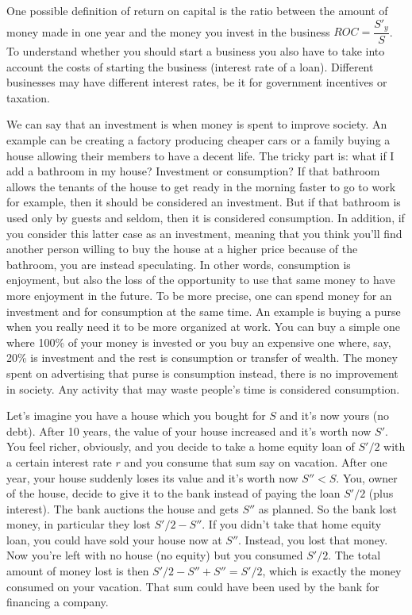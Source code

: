 One possible definition of return on capital is the ratio between the amount of money made in one year and the money you invest in the business $ROC = \dfrac{S'_y}{S}$. To understand whether you should start a business you also have to take into account the costs of starting the business (interest rate of a loan). Different businesses may have different interest rates, be it for government incentives or taxation.

We can say that an investment is when money is spent to improve society. An example can be creating a factory producing cheaper cars or a family buying a house allowing their members to have a decent life. The tricky part is: what if I add a bathroom in my house? Investment or consumption? If that bathroom allows the tenants of the house to get ready in the morning faster to go to work for example, then it should be considered an investment. But if that bathroom is used only by guests and seldom, then it is considered consumption. In addition, if you consider this latter case as an investment, meaning that you think you'll find another person willing to buy the house at a higher price because of the bathroom, you are instead speculating. In other words, consumption is enjoyment, but also the loss of the opportunity to use that same money to have more enjoyment in the future. To be more precise, one can spend money for an investment and for consumption at the same time. An example is buying a purse when you really need it to be more organized at work. You can buy a simple one where 100\% of your money is invested or you buy an expensive one where, say, 20\% is investment and the rest is consumption or transfer of wealth. The money spent on advertising that purse is consumption instead, there is no improvement in society. Any activity that may waste people's time is considered consumption.

Let's imagine you have a house which you bought for $S$ and it's now yours (no debt). After 10 years, the value of your house increased and it's worth now $S'$. You feel richer, obviously, and you decide to take a home equity loan of $S'/2$ with a certain interest rate $r$ and you consume that sum say on vacation. After one year, your house suddenly loses its value and it's worth now $S''< S$. You, owner of the house, decide to give it to the bank instead of paying the loan $S'/2$ (plus interest). The bank auctions the house and gets $S''$ as planned. So the bank lost money, in particular they lost $S'/2 - S''$. If you didn't take that home equity loan, you could have sold your house now at $S''$. Instead, you lost that money. Now you're left with no house (no equity) but you consumed $S'/2$. The total amount of money lost is then $S'/2-S''+S'' = S'/2$, which is exactly the money consumed on your vacation. That sum could have been used by the bank for financing a company.
